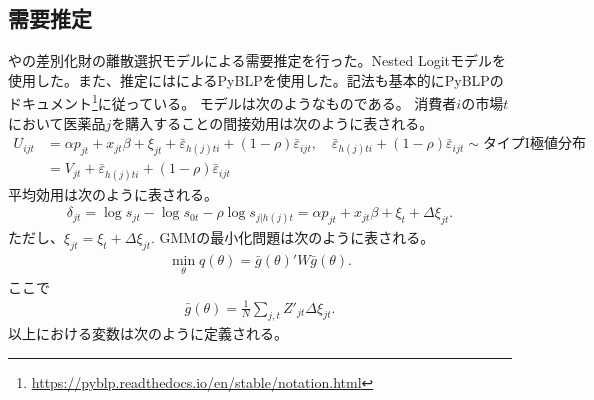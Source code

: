 \documentclass[a4paper,11pt,uplatex]{jsarticle}
\theoremstyle{definition}
\begin{document}
\subsection{需要推定}
\cite{Berry1994}や\cite{BLP}の差別化財の離散選択モデルによる需要推定を行った。Nested Logitモデルを使用した。また、推定には\cite{ConlonGortmaker}によるPyBLPを使用した。記法も基本的にPyBLPのドキュメント\footnote{\url{https://pyblp.readthedocs.io/en/stable/notation.html}}に従っている。
モデルは次のようなものである。
消費者\(i\)の市場\(t\)において医薬品\(j\)を購入することの間接効用は次のように表される。
\begin{align*}
U_{ijt}&=\alpha p_{jt} + x_{jt} \beta + \xi_{jt} + \bar\varepsilon_{h(j)ti}+(1-\rho)\bar \varepsilon_{ijt}, \quad \bar\varepsilon_{h(j)ti}+(1-\rho) \bar \varepsilon_{ijt} \sim \textrm{タイプI極値分布}\\
&=V_{jt}+\bar\varepsilon_{h(j)ti}+(1-\rho)\bar \varepsilon_{ijt}
\end{align*}
平均効用は次のように表される。
\begin{align*}
\delta_{jt}=\log s_{jt}-\log s_{0t}-\rho \log s_{j | h(j)t}=\alpha p_{jt} + x_{jt} \beta +\xi_t+\Delta \xi_{jt}.
\end{align*}
ただし、\(\xi_{jt}=\xi_t+\Delta \xi_{jt}\).
GMMの最小化問題は次のように表される。
\begin{align*}
\min_\theta q(\theta)=\bar g(\theta)'W \bar g(\theta).
\end{align*}
ここで
\begin{align*}
\bar g(\theta)=\frac{1}{N} \sum _{j,t} Z'_{jt} \Delta\xi_{jt}.
\end{align*}
以上における変数は次のように定義される。
\end{document}
